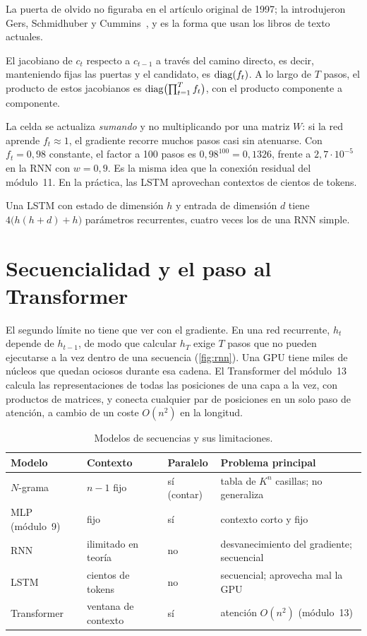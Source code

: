 La puerta de olvido no figuraba en el artículo original de 1997; la introdujeron Gers, Schmidhuber y Cummins~\cite{gers}, y es la forma que usan los libros de texto actuales.

\begin{proposicion}\label{prop:lstm-grad}
El jacobiano de $c_t$ respecto a $c_{t-1}$ a través del camino directo, es decir, manteniendo fijas las puertas y el candidato, es $\operatorname{diag}(f_t)$. A lo largo de $T$ pasos, el producto de estos jacobianos es $\operatorname{diag}\bigl(\prod_{t=1}^{T}f_t\bigr)$, con el producto componente a componente.
\end{proposicion}

La celda se actualiza \emph{sumando} y no multiplicando por una matriz $W$: si la red aprende $f_t\approx 1$, el gradiente recorre muchos pasos casi sin atenuarse. Con $f_t=0{,}98$ constante, el factor a 100 pasos es $0{,}98^{100}=0{,}1326$, frente a $2{,}7\cdot 10^{-5}$ en la RNN con $w=0{,}9$. Es la misma idea que la conexión residual del módulo~11. En la práctica, las LSTM aprovechan contextos de cientos de tokens.

\begin{corolario}\label{cor:param-lstm}
Una LSTM con estado de dimensión $h$ y entrada de dimensión $d$ tiene $4\bigl(h(h+d)+h\bigr)$ parámetros recurrentes, cuatro veces los de una RNN simple.
\end{corolario}

\section{Secuencialidad y el paso al Transformer}

El segundo límite no tiene que ver con el gradiente. En una red recurrente, $h_t$ depende de $h_{t-1}$, de modo que calcular $h_T$ exige $T$ pasos que no pueden ejecutarse a la vez dentro de una secuencia (\cref{fig:rnn}). Una GPU tiene miles de núcleos que quedan ociosos durante esa cadena. El Transformer del módulo~13 calcula las representaciones de todas las posiciones de una capa a la vez, con productos de matrices, y conecta cualquier par de posiciones en un solo paso de atención, a cambio de un coste $O(n^{2})$ en la longitud.

\begin{table}[h]
\centering\small
\caption{Modelos de secuencias y sus limitaciones.}\label{tab:modelos-seq}
\begin{tabularx}{\textwidth}{@{}lll>{\raggedright\arraybackslash}X@{}}
\toprule
Modelo & Contexto & Paralelo & Problema principal \\
\midrule
$N$-grama & $n-1$ fijo & sí (contar) & tabla de $K^{n}$ casillas; no generaliza \\
MLP (módulo~9) & fijo & sí & contexto corto y fijo \\
RNN & ilimitado en teoría & no & desvanecimiento del gradiente; secuencial \\
LSTM & cientos de tokens & no & secuencial; aprovecha mal la GPU \\
Transformer & ventana de contexto & sí & atención $O(n^{2})$ (módulo~13) \\
\bottomrule
\end{tabularx}
\end{table}


